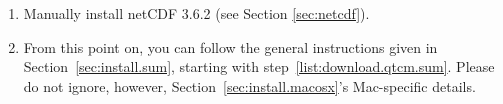 \begin{enumerate}
\item Manually install netCDF 3.6.2
	(see Section \ref{sec:netcdf}).

\item From this point on, you can follow the
	general instructions given in Section~\ref{sec:install.sum},
	starting with step~\ref{list:download.qtcm.sum}.
	Please do not ignore, however, Section~\ref{sec:install.macosx}'s
	Mac-specific details.

\end{enumerate}



